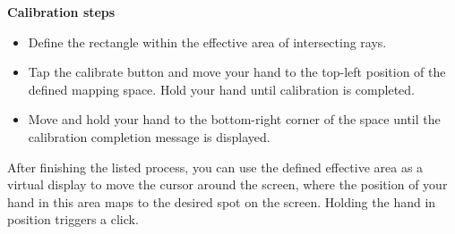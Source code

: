 \documentclass[12pt,a4paper]{article}
\begin{document}
\textbf{Calibration steps}
\begin{itemize}
    \item Define the rectangle within the effective area of intersecting rays.
    \item Tap the calibrate button and move your hand to the top-left position of the defined mapping space. Hold your hand until calibration is completed.
    \item Move and hold your hand to the bottom-right corner of the space until the calibration completion message is displayed.
\end{itemize}

After finishing the listed process, you can use the defined effective area as a virtual display to move the cursor around the screen, where the position of your hand in this area maps to the desired spot on the screen. Holding the hand in position triggers a click.
\end{document}
